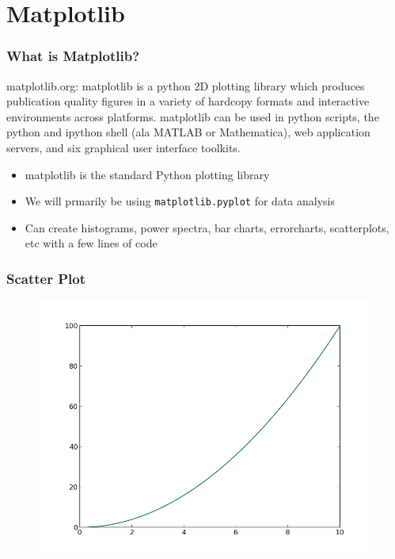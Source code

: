 \documentclass{beamer}
\begin{document}
\section{Matplotlib}

\begin{frame}
\frametitle{What is Matplotlib?}

matplotlib.org: matplotlib is a python 2D plotting library which produces publication quality figures in a variety of hardcopy formats and interactive environments across platforms. matplotlib can be used in python scripts, the python and ipython shell (ala MATLAB or Mathematica), web application servers, and six graphical user interface toolkits.

\begin{itemize}
\setlength{\itemsep}{0.1in}
\item{matplotlib is the standard Python plotting library}
\item{We will prmarily be using \texttt{matplotlib.pyplot} for data analysis}
\item{Can create histograms, power spectra, bar charts, errorcharts, scatterplots, etc with a few lines of code}
\end{itemize}
\end{frame}

\begin{frame}
\frametitle{Scatter Plot}
\lstset{basicstyle=\scriptsize}
\begin{figure}[h]
\includegraphics[width=.6\textwidth]{images/line_plot.png}
\end{figure}
\end{frame}
\end{document}
